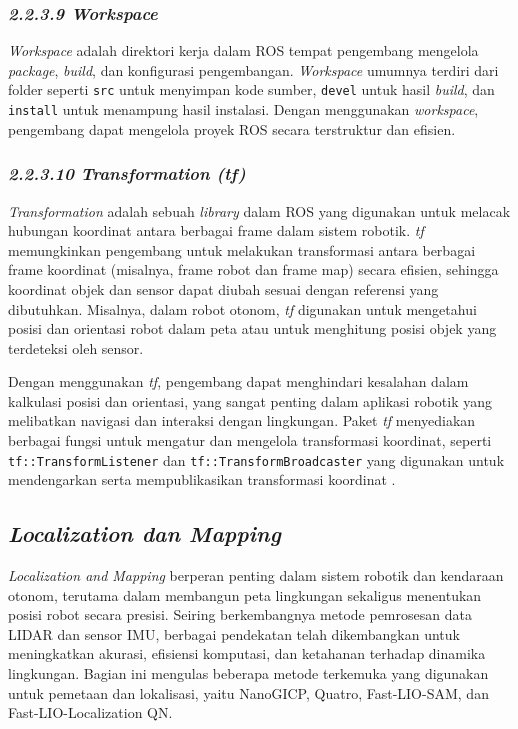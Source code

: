 \subsubsection{\emph{2.2.3.9 Workspace}}
\emph{Workspace} adalah direktori kerja dalam ROS tempat pengembang mengelola \emph{package}, \emph{build}, dan konfigurasi pengembangan. \emph{Workspace} umumnya terdiri dari folder seperti \texttt{src} untuk menyimpan kode sumber, \texttt{devel} untuk hasil \emph{build}, dan \texttt{install} untuk menampung hasil instalasi. Dengan menggunakan \emph{workspace}, pengembang dapat mengelola proyek ROS secara terstruktur dan efisien.

\subsubsection{\emph{2.2.3.10 Transformation (tf)}}
\emph{Transformation} adalah sebuah \emph{library} dalam ROS yang digunakan untuk melacak hubungan koordinat antara berbagai frame dalam sistem robotik. \emph{tf} memungkinkan pengembang untuk melakukan transformasi antara berbagai frame koordinat (misalnya, frame robot dan frame map) secara efisien, sehingga koordinat objek dan sensor dapat diubah sesuai dengan referensi yang dibutuhkan. Misalnya, dalam robot otonom, \emph{tf} digunakan untuk mengetahui posisi dan orientasi robot dalam peta atau untuk menghitung posisi objek yang terdeteksi oleh sensor.

Dengan menggunakan \emph{tf}, pengembang dapat menghindari kesalahan dalam kalkulasi posisi dan orientasi, yang sangat penting dalam aplikasi robotik yang melibatkan navigasi dan interaksi dengan lingkungan. Paket \emph{tf} menyediakan berbagai fungsi untuk mengatur dan mengelola transformasi koordinat, seperti \texttt{tf::TransformListener} dan \texttt{tf::TransformBroadcaster}  yang digunakan untuk mendengarkan serta mempublikasikan transformasi koordinat \cite{ros_noetic}.

\subsection{\emph{Localization dan Mapping}}

 \textit{ Localization and Mapping} berperan penting dalam sistem robotik dan kendaraan otonom, terutama dalam membangun peta lingkungan sekaligus menentukan posisi robot secara presisi. Seiring berkembangnya metode pemrosesan data LIDAR dan sensor IMU, berbagai pendekatan telah dikembangkan untuk meningkatkan akurasi, efisiensi komputasi, dan ketahanan terhadap dinamika lingkungan. Bagian ini mengulas beberapa metode terkemuka yang digunakan untuk pemetaan dan lokalisasi, yaitu NanoGICP, Quatro, Fast-LIO-SAM, dan Fast-LIO-Localization QN.

